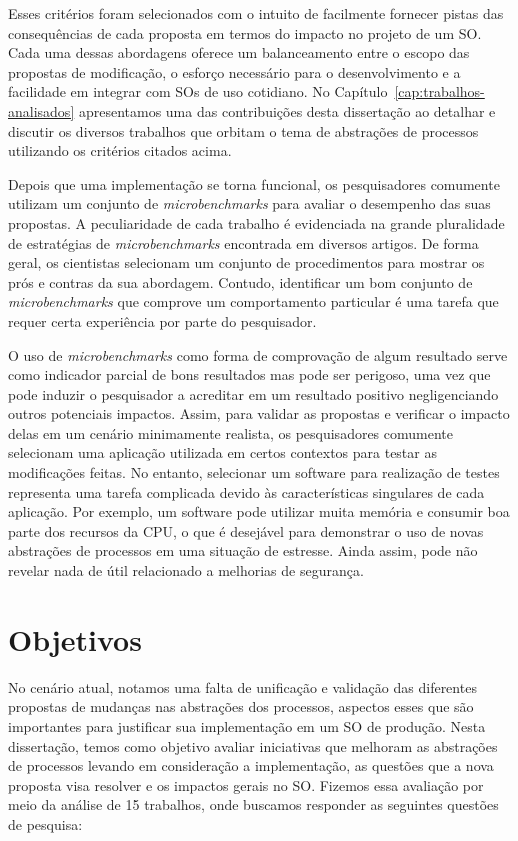 Esses critérios foram selecionados com o intuito de facilmente fornecer pistas
das consequências de cada proposta em termos do impacto no projeto de um SO.
Cada uma dessas abordagens oferece um balanceamento entre o escopo das
propostas de modificação, o esforço necessário para o desenvolvimento e a
facilidade em integrar com SOs de uso cotidiano. No
Capítulo~\ref{cap:trabalhos-analisados} apresentamos uma das contribuições
desta dissertação ao detalhar e discutir os diversos trabalhos que orbitam o
tema de abstrações de processos utilizando os critérios citados acima.

Depois que uma implementação se torna funcional, os pesquisadores comumente
utilizam um conjunto de \emph{microbenchmarks} para avaliar o desempenho das
suas propostas. A peculiaridade de cada trabalho é evidenciada na grande
pluralidade de estratégias de \emph{microbenchmarks} encontrada em diversos
artigos.  De forma geral, os cientistas selecionam um conjunto de procedimentos
para mostrar os prós e contras da sua abordagem. Contudo, identificar um bom
conjunto de \emph{microbenchmarks} que comprove um comportamento particular é
uma tarefa que requer certa experiência por parte do pesquisador.

O uso de \textit{microbenchmarks} como forma de comprovação de algum resultado
serve como indicador parcial de bons resultados mas pode ser perigoso, uma vez
que pode induzir o pesquisador a acreditar em um resultado positivo
negligenciando outros potenciais impactos. Assim, para validar as propostas e
verificar o impacto delas em um cenário minimamente realista, os pesquisadores
comumente selecionam uma aplicação utilizada em certos contextos para testar as
modificações feitas. No entanto, selecionar um software para realização de
testes representa uma tarefa complicada devido às características singulares de
cada aplicação. Por exemplo, um software pode utilizar muita memória e consumir
boa parte dos recursos da CPU, o que é desejável para demonstrar o uso de novas
abstrações de processos em uma situação de estresse. Ainda assim, pode não
revelar nada de útil relacionado a melhorias de segurança.

\section{Objetivos}

No cenário atual, notamos uma falta de unificação e validação das diferentes
propostas de mudanças nas abstrações dos processos, aspectos esses que são
importantes para justificar sua implementação em um SO de produção. Nesta
dissertação, temos como objetivo avaliar iniciativas que melhoram as abstrações de
processos levando em consideração a implementação, as questões que a nova
proposta visa resolver e os impactos gerais no SO. Fizemos essa avaliação por
meio da análise de 15 trabalhos, onde buscamos responder as seguintes
questões de pesquisa:

